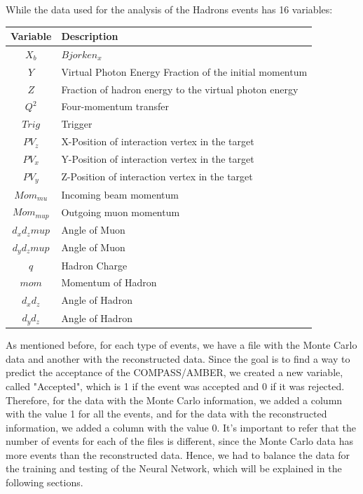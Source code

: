 \documentclass{article}
\begin{document}
While the data used for the analysis of the Hadrons events has 16 variables:

\begin{table}[H]
    \centering
    \begin{tabular}{c|l}
    \textbf{Variable} & \textbf{Description} \\ \hline
    $X_b$ & $Bjorken_x$ \\
    $Y$ & Virtual Photon Energy Fraction of the initial momentum\\
    $Z$ & Fraction of hadron energy to the virtual photon energy \\
    $Q^2$ & Four-momentum transfer \\
    $Trig$ & Trigger \\
    $PV_z$ & X-Position of interaction vertex in the target\\
    $PV_x$ & Y-Position of interaction vertex in the target\\
    $PV_y$ & Z-Position of interaction vertex in the target\\
    $Mom_{mu}$ & Incoming beam momentum\\
    $Mom_{mup}$ & Outgoing muon momentum\\
    $d_xd_zmup$ & Angle of Muon \\
    $d_yd_zmup$ & Angle of Muon \\
    $q$ & Hadron Charge \\
    $mom$ & Momentum of Hadron \\
    $d_xd_z$ & Angle of Hadron \\
    $d_yd_z$ & Angle of Hadron \\
    \end{tabular}
\end{table}



As mentioned before, for each type of events, we have a file with the Monte Carlo data and another with the reconstructed data.
Since the goal is to find a way to predict the acceptance of the COMPASS/AMBER, we created a new variable, called "Accepted",
which is 1 if the event was accepted and 0 if it was rejected. Therefore, for the data with the Monte Carlo information, we added
a column with the value 1 for all the events, and for the data with the reconstructed information, we added a column with the value 0.
It's important to refer that the number of events for each of the files is different, since the Monte Carlo data has more events than the reconstructed data.
Hence, we had to balance the data for the training and testing of the Neural Network, which will be explained in the following sections.
\end{document}
